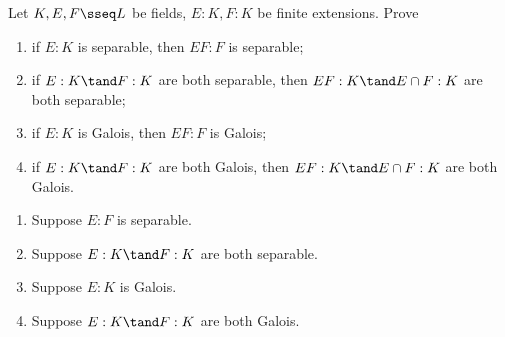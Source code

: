 \documentclass{article}
\begin{document}
\setcounter{section}{10} %
\begin{exercise}
  Let \( K,E,F\sseq L \) be fields, \( E:K,F:K \) be finite extensions. Prove \begin{enumerate}[label=(\alph*)]
    \item if \( E:K \) is separable, then \( EF:F \) is separable;
    \item if \( E:K\tand F:K \) are both separable, then \( EF:K \tand E\cap F:K \) are both separable;
    \item if \( E:K \) is Galois, then \( EF:F \) is Galois;
    \item if \( E:K\tand F:K \) are both Galois, then \( EF:K\tand E\cap F:K \) are both Galois.
  \end{enumerate}
\end{exercise}
\begin{enumerate}[label=(\alph*)]
  \item \begin{solution}
    Suppose \( E:F \) is separable.

  \end{solution}
  \item \begin{solution}
    Suppose \( E:K\tand F:K \) are both separable.

  \end{solution}
  \item \begin{solution}
    Suppose \( E:K \) is Galois.

  \end{solution}
  \item \begin{solution}
    Suppose \( E:K\tand F:K \) are both Galois.

  \end{solution}
\end{enumerate}
\end{document}
